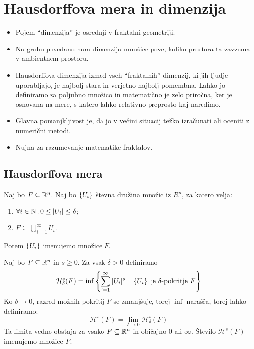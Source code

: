 \section{Hausdorffova mera in dimenzija}
\begin{itemize}
    \item Pojem "`dimenzija"' je osrednji v fraktalni geometriji.
    \item Na grobo povedano nam dimenzija množice pove, koliko prostora ta zavzema v ambientnem prostoru.
    \item Hausdorffova dimenzija izmed vseh "`fraktalnih"' dimenzij, ki jih ljudje uporabljajo, je najbolj stara in verjetno najbolj pomembna. Lahko jo definiramo za poljubno množico in matematično je zelo priročna, ker je osnovana na mere, s katero lahko relativno preprosto kaj naredimo.
    \item Glavna pomanjkljivost je, da jo v večini situacij težko izračunati ali oceniti z numerični metodi.
    \item Nujna za razumevanje matematike fraktalov.
\end{itemize}

\subsection{Hausdorffova mera}
\begin{definicija}
    Naj bo \(F \subseteq \mathbb{R}^n\). Naj bo \(\left\{U_i\right\}\) števna družina množic iz \(R^n\), za katero velja:
    \begin{enumerate}
        \item \(\forall i \in \mathbb{N} \,.\, 0 \leq |U_i| \leq \delta\);
        \item \(F \subseteq \bigcup_{i=1}^\infty U_i\).
    \end{enumerate}
    Potem \(\left\{U_i\right\}\) imenujemo  množice \(F\).
\end{definicija}
%
Naj bo \(F \subseteq \mathbb{R}^n\) in \(s \geq 0\). Za vsak \(\delta > 0\) definiramo 
\[\mathcal{H}^s_\delta(F) = \inf \left\{\sum_{i=1}^{\infty}|U_i|^s \ | \ \left\{U_i\right\} \ \text{je \(\delta\)-pokritje \(F\)}\right\}\]
%
Ko \(\delta \to 0\), razred možnih pokritij \(F\) se zmanjšuje, torej \(\inf\) narašča, torej lahko definiramo:
\[\mathcal{H}^s(F) = \lim_{\delta \to 0} \mathcal{H}^s_\delta(F)\]
Ta limita vedno obstaja za vsako \(F \subseteq \mathbb{R}^n\) in običajno \(0\) ali \(\infty\). Število \(\mathcal{H}^s(F)\) imenujemo  množice \(F\).

